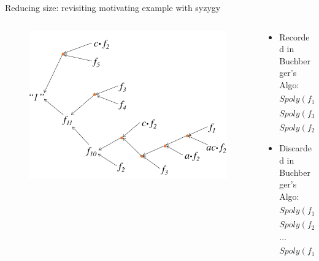 \documentclass[xcolor=dvipsnames]{beamer}
\newcommand{\bi}{\begin{itemize}}
\newcommand{\ei}{\end{itemize}}
\begin{document}
\begin{frame}{\large{Reducing size: revisiting motivating example with syzygy}}
\vspace{-0.2in}
\begin{columns}[onlytextwidth]
\begin{column}{0.5\textwidth}
\begin{figure}
\centering
\includegraphics[scale=0.25]{refutation_tree.pdf}
\end{figure}
\end{column}
\begin{column}{0.5\textwidth}
\bi
\item Recorded in Buchberger's Algo:\\
$Spoly(f_1,f_2)\xrightarrow{F}_+ f_{10}$\\
$Spoly(f_3,f_4)\xrightarrow{F}_+ f_{11}$\\
$Spoly(f_2,f_5)\xrightarrow{F}_+ 1$
\item Discarded in Buchberger's Algo:\\
$Spoly(f_1,f_3)\xrightarrow{F}_+ 0$\\
$Spoly(f_2,f_3)\xrightarrow{F}_+ 0$\\
$\dots$\\
$Spoly(f_1,f_5)\xrightarrow{F}_+ 0$
\ei
\end{column}
\end{columns}
\end{frame}
\end{document}
